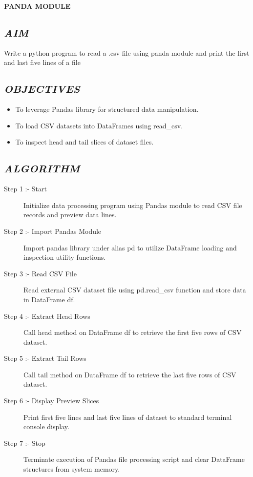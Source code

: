\documentclass[11pt,a4paper]{article}
\begin{document}
\vspace{0.2cm}
\begin{center}
{\Huge \textbf{\textcolor{navyblue}{PANDA MODULE}}}
\end{center}
\vspace{0.3cm}

\subsection*{\textit{AIM}}
Write a python program to read a .csv file using panda module and print the first and last five lines of a file

\subsection*{\textit{OBJECTIVES}}
\begin{itemize}
  \item To leverage Pandas library for structured data manipulation.
  \item To load CSV datasets into DataFrames using read_csv.
  \item To inspect head and tail slices of dataset files.
\end{itemize}

\subsection*{\textit{ALGORITHM}}
\begin{description}
  \item[Step 1 :- Start] Initialize data processing program using Pandas module to read CSV file records and preview data lines.
  \item[Step 2 :- Import Pandas Module] Import pandas library under alias pd to utilize DataFrame loading and inspection utility functions.
  \item[Step 3 :- Read CSV File] Read external CSV dataset file using pd.read_csv function and store data in DataFrame df.
  \item[Step 4 :- Extract Head Rows] Call head method on DataFrame df to retrieve the first five rows of CSV dataset.
  \item[Step 5 :- Extract Tail Rows] Call tail method on DataFrame df to retrieve the last five rows of CSV dataset.
  \item[Step 6 :- Display Preview Slices] Print first five lines and last five lines of dataset to standard terminal console display.
  \item[Step 7 :- Stop] Terminate execution of Pandas file processing script and clear DataFrame structures from system memory.
\end{description}
\end{document}
